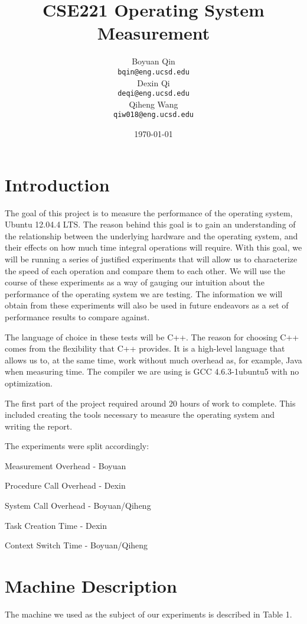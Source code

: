 \documentclass{article} %
\title{CSE221 Operating System Measurement}
\author{
  Boyuan Qin\\
  \texttt{bqin@eng.ucsd.edu}\\
  \And
  Dexin Qi\\
  \texttt{deqi@eng.ucsd.edu}\\
  \And
  Qiheng Wang\\
  \texttt{qiw018@eng.ucsd.edu}\\
}
\date{\today}
\begin{document}
\maketitle

\section{Introduction}
The goal of this project is to measure the performance of the operating
system, Ubuntu 12.04.4 LTS\@.  The reason behind this goal is to gain an
understanding of the relationship between the underlying hardware and the
operating system, and their effects on how much time integral operations will
require.  With this goal, we will be running a series of justified experiments
that will allow us to characterize the speed of each operation and compare
them to each other.  We will use the course of these experiments as a way of
gauging our intuition about the performance of the operating system we are
testing.  The information we will obtain from these experiments will also be
used in future endeavors as a set of performance results to compare against.

The language of choice in these tests will be C++.  The reason for choosing
C++ comes from the flexibility that C++ provides.  It is a high-level language
that allows us to, at the same time, work without much overhead as, for
example, Java when measuring time.  The compiler we are using is GCC
4.6.3-1ubuntu5 with no optimization.

The first part of the project required around 20 hours of work to complete. This included creating the tools necessary to measure the operating system and writing the report.

The experiments were split accordingly:

Measurement Overhead - Boyuan

Procedure Call Overhead - Dexin

System Call Overhead - Boyuan/Qiheng

Task Creation Time - Dexin

Context Switch Time - Boyuan/Qiheng

\section{Machine Description}

The machine we used as the subject of our experiments is described in Table 1.
\end{document}
